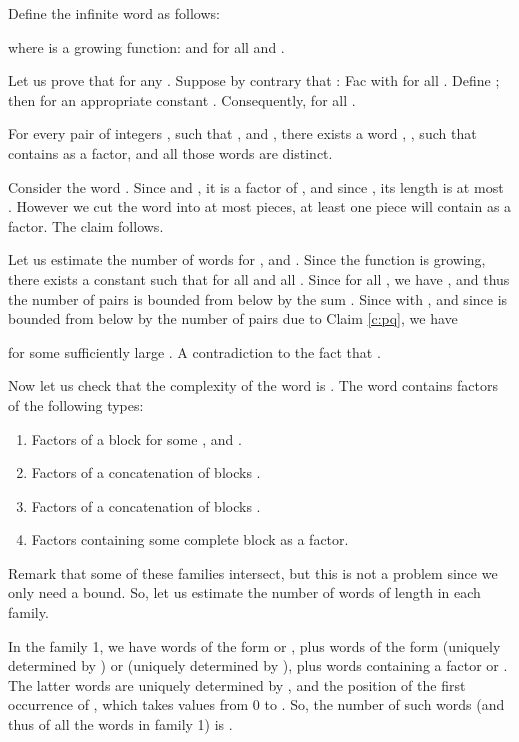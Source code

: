 \documentclass[runningheads,envcountsect,envcountsame]{llncs}
\begin{document}
\medskip

Define the infinite word  as follows:


where  is a growing function:  and  for all  and . 


Let us prove that  for any . Suppose by contrary
that : Fac with  for all . Define ; then  for an appropriate constant . Consequently,  for all .

\begin{claim}\label{c:pq}
For every pair of integers , such that ,  and , there
exists a word , , such that  contains 
as a factor, and all those words  are distinct.
\end{claim}

 Consider the word .
Since  and , it is a factor of ,
and since , its length is at most .
However we cut the word  into at most 
pieces, at least one piece will contain  as a factor.
The claim follows. \hfill 

\medskip

Let us estimate the number of words  for ,
 and . Since the function  is growing, there exists a constant  such that  for all  and all . Since  for all , we have , and thus the number of pairs  is bounded from below by the sum . Since  with , and since  is bounded from below by the number of pairs  due to Claim \ref{c:pq}, we have

for some sufficiently large . A contradiction to the fact that .

\medskip
Now let us check that the complexity of the word  is . The
word  contains factors of the following types:

\begin{enumerate}

\item Factors of a block  for some ,  and .

\item Factors of a concatenation of blocks .

\item Factors of a concatenation of blocks .

\item Factors containing some complete block   as a factor.
\end{enumerate}
Remark that some of these families intersect, but this is not a
problem since we only need a bound. So, let us estimate the number
of words of length  in each family.

In the family 1, we have  words of the form  or , plus  words of the form  (uniquely determined by ) or  (uniquely determined by ), plus words containing a factor  or . The latter words are uniquely determined by ,  and the position of the first occurrence of , which takes values from 0 to . So, the number of such words (and thus of all the words in family 1) is .
\end{document}
